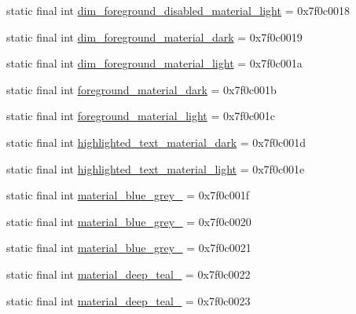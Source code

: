 \begin{CompactItemize}
\item 
static final int \hyperlink{classandroid_1_1support_1_1v7_1_1palette_1_1_r_1_1color_25bb90083974209989210a0b85fea35b}{dim\_\-foreground\_\-disabled\_\-material\_\-light} = 0x7f0c0018
\item 
static final int \hyperlink{classandroid_1_1support_1_1v7_1_1palette_1_1_r_1_1color_30b83cce7bbc598f529037e285c110ff}{dim\_\-foreground\_\-material\_\-dark} = 0x7f0c0019
\item 
static final int \hyperlink{classandroid_1_1support_1_1v7_1_1palette_1_1_r_1_1color_142f334e41c560e9e4bbc77ae29f9a4f}{dim\_\-foreground\_\-material\_\-light} = 0x7f0c001a
\item 
static final int \hyperlink{classandroid_1_1support_1_1v7_1_1palette_1_1_r_1_1color_e3dd7f55d8a0c16d5217a5a4e74dd82b}{foreground\_\-material\_\-dark} = 0x7f0c001b
\item 
static final int \hyperlink{classandroid_1_1support_1_1v7_1_1palette_1_1_r_1_1color_e7dd3889adcaf5aab15ba2629787dd81}{foreground\_\-material\_\-light} = 0x7f0c001c
\item 
static final int \hyperlink{classandroid_1_1support_1_1v7_1_1palette_1_1_r_1_1color_2419fac44be599752f35f6654a79ae35}{highlighted\_\-text\_\-material\_\-dark} = 0x7f0c001d
\item 
static final int \hyperlink{classandroid_1_1support_1_1v7_1_1palette_1_1_r_1_1color_bf96d1a08abc2b0deb216da3f896231d}{highlighted\_\-text\_\-material\_\-light} = 0x7f0c001e
\item 
static final int \hyperlink{classandroid_1_1support_1_1v7_1_1palette_1_1_r_1_1color_501441dcec7d6fc1016c31f25e0abefe}{material\_\-blue\_\-grey\_} = 0x7f0c001f
\item 
static final int \hyperlink{classandroid_1_1support_1_1v7_1_1palette_1_1_r_1_1color_1f32a05ee42535b5816ed67c0cabcb27}{material\_\-blue\_\-grey\_} = 0x7f0c0020
\item 
static final int \hyperlink{classandroid_1_1support_1_1v7_1_1palette_1_1_r_1_1color_649d1358b3035ed5c6aa805b7a09655e}{material\_\-blue\_\-grey\_} = 0x7f0c0021
\item 
static final int \hyperlink{classandroid_1_1support_1_1v7_1_1palette_1_1_r_1_1color_0113964ef2a420d9f24f58a67d559f69}{material\_\-deep\_\-teal\_} = 0x7f0c0022
\item 
static final int \hyperlink{classandroid_1_1support_1_1v7_1_1palette_1_1_r_1_1color_af7859b0eae286761d160f3a53b8bda7}{material\_\-deep\_\-teal\_} = 0x7f0c0023
\item 

\end{CompactItemize}
